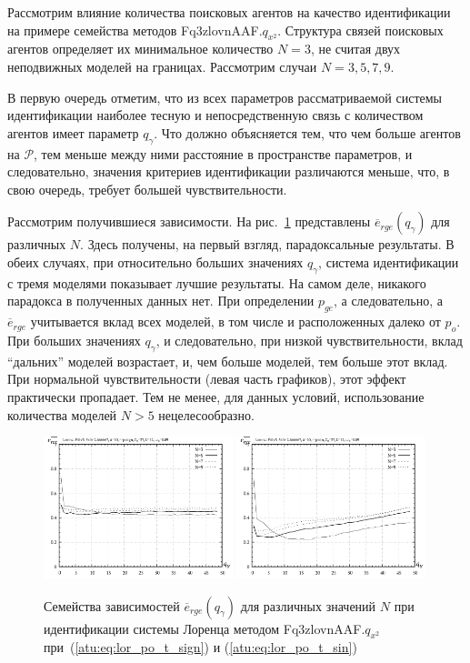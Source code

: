 Рассмотрим влияние количества поисковых агентов
на качество идентификации на примере семейства методов Fq3zlovnAAF.$q_{x^2}$.
Структура связей поисковых агентов определяет их минимальное количество $N=3$,
не считая двух неподвижных моделей на границах.
Рассмотрим случаи $N=3,5,7,9$.

В первую очередь отметим,
что из всех параметров рассматриваемой системы идентификации
наиболее тесную и непосредственную связь с количеством
агентов имеет параметр $q_\gamma$. Что должно объясняется тем, что чем больше
агентов на $\mathcal{P}$, тем меньше между ними расстояние в пространстве параметров,
и следовательно, значения критериев идентификации различаются меньше,
что, в свою очередь, требует большей чувствительности.

Рассмотрим получившиеся зависимости.
На рис.~\ref{atu:f:lor_N_rge} представлены $\overline{e}_{rge}(q_\gamma)$
для различных $N$. Здесь получены, на первый взгляд, парадоксальные результаты.
В обеих случаях, при относительно больших значениях $q_\gamma$,
система идентификации с тремя моделями показывает лучшие результаты.
На самом деле, никакого парадокса в полученных данных нет.
При определении $p_{ge}$, а следовательно, а $\overline{e}_{rge}$
учитывается вклад всех моделей, в том числе и расположенных далеко от $p_o$.
При больших значениях $q_\gamma$, и следовательно, при низкой чувствительности,
вклад ``дальних'' моделей возрастает, и, чем больше моделей,
тем больше этот вклад. При нормальной чувствительности (левая часть графиков),
этот эффект практически пропадает. Тем не менее, для данных условий,
использование количества моделей $N>5$ нецелесообразно.



\begin{figure}[ht!]
  \centerline{
    \includegraphics[width=0.49\textwidth]{p/cha/lor/Fq3zlovnAAF/N/lor_Fq3zlovnAAF_qx2_p_qg_e_rge_sign.png}
    \hfill
    \includegraphics[width=0.49\textwidth]{p/cha/lor/Fq3zlovnAAF/N/lor_Fq3zlovnAAF_qx2_p_qg_e_rge_sin.png}
  }
  \caption{Семейства зависимостей $\overline{e}_{rge}(q_\gamma)$ для различных значений $N$ при идентификации системы Лоренца методом Fq3zlovnAAF.$q_{x^2}$
   при~(\ref{atu:eq:lor_po_t_sign}) и (\ref{atu:eq:lor_po_t_sin})}
  \label{atu:f:lor_N_rge}
\end{figure}


